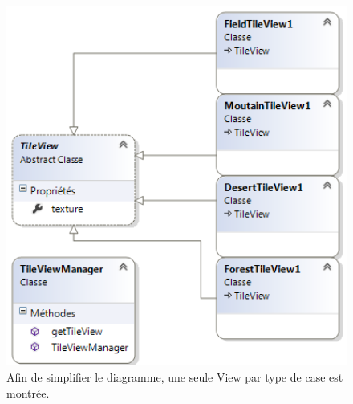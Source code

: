 		\begin{figure}[h!]
			\begin{center}
				\includegraphics[width=1\textwidth]{figure/classe_view.png}
			\end{center}
			\caption{Afin de simplifier le diagramme, une seule View par type de case est montrée.}
			\label{fig:classe_view}
		\end{figure}
